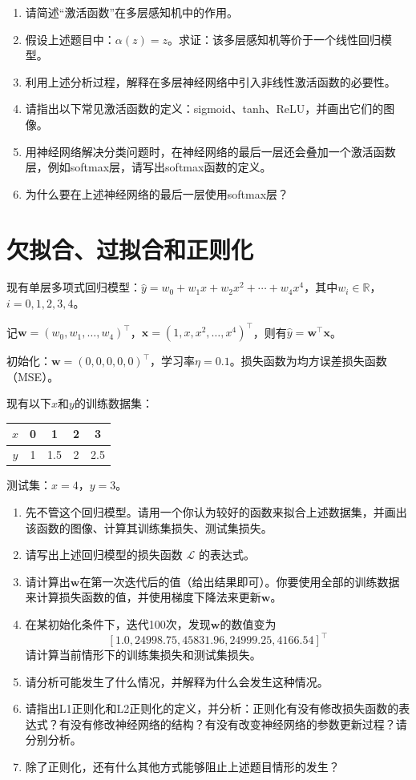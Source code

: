 \documentclass[12pt]{ctexart}
\begin{document}
\begin{enumerate}
    \item 请简述“激活函数”在多层感知机中的作用。
    \item 假设上述题目中：$\alpha(z) = z$。求证：该多层感知机等价于一个线性回归模型。
    \item 利用上述分析过程，解释在多层神经网络中引入非线性激活函数的必要性。
    \item 请指出以下常见激活函数的定义：sigmoid、tanh、ReLU，并画出它们的图像。
    \item 用神经网络解决分类问题时，在神经网络的最后一层还会叠加一个激活函数层，例如softmax层，请写出softmax函数的定义。
    \item 为什么要在上述神经网络的最后一层使用softmax层？
\end{enumerate}

\section{欠拟合、过拟合和正则化}

现有单层多项式回归模型：$\hat{y} = w_0 + w_1 x + w_2 x^2 + \cdots + w_4 x^4$，其中$w_i \in \mathbb{R}$，$i = 0, 1, 2, 3, 4$。

记$\mathbf{w} = (w_0, w_1, \ldots, w_4)^\top$，$\mathbf{x} = (1, x, x^2, \ldots, x^4)^\top$，则有$\hat{y} = \mathbf{w}^\top \mathbf{x}$。

初始化：$\mathbf{w} = (0, 0, 0, 0, 0)^\top$，学习率$\eta = 0.1$。损失函数为均方误差损失函数（MSE）。

现有以下$x$和$y$的训练数据集：
\begin{center}
    \begin{tabular}{c|cccc}
        \toprule
        $x$ & 0 & 1 & 2 & 3 \\
        \midrule
        $y$ & 1 & 1.5 & 2 & 2.5 \\
        \bottomrule
    \end{tabular}
\end{center}

测试集：$x=4$，$y=3$。

\begin{enumerate}
    \item 先不管这个回归模型。请用一个你认为较好的函数来拟合上述数据集，并画出该函数的图像、计算其训练集损失、测试集损失。
    \item 请写出上述回归模型的损失函数 $\mathcal{L}$ 的表达式。
    \item 请计算出$\mathbf{w}$在第一次迭代后的值（给出结果即可）。你要使用全部的训练数据来计算损失函数的值，并使用梯度下降法来更新$\mathbf{w}$。
    \item 在某初始化条件下，迭代100次，发现$\mathbf{w}$的数值变为
    \[\left[1.0, 24998.75, 45831.96, 24999.25, 4166.54\right]^\top\]
    请计算当前情形下的训练集损失和测试集损失。
    \item 请分析可能发生了什么情况，并解释为什么会发生这种情况。
    \item 请指出L1正则化和L2正则化的定义，并分析：正则化有没有修改损失函数的表达式？有没有修改神经网络的结构？有没有改变神经网络的参数更新过程？请分别分析。
    \item 除了正则化，还有什么其他方式能够阻止上述题目情形的发生？
\end{enumerate}
\end{document}
